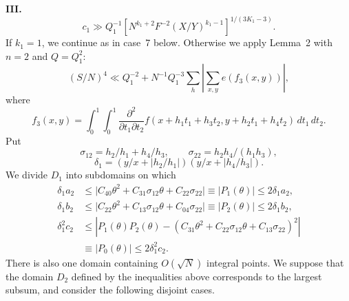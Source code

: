 \documentclass[10pt]{article}
\begin{document}
\medskip
\noindent\textbf{III.}
\[
  c_1\gg Q_1^{-1}
  \left[N^{k_1+2}F^{-2}(X/Y)^{k_1-1}\right]^{1/(3K_1-3)}.
\]
If $k_1=1$, we continue as in case~7 below. Otherwise we apply Lemma~2 with $n=2$ and $Q=Q_1^2$:
\[
  (S/N)^4\ll Q_1^{-2}
  +N^{-1}Q_1^{-3}\sum_h
   \left\lvert\sum_{x,y}e(f_3(x,y))\right\rvert,
\]
where
\[
  f_3(x,y)=\int_0^1\!\int_0^1
  \frac{\partial^2}{\partial t_1\partial t_2}
  f(x+h_1t_1+h_3t_2,y+h_2t_1+h_4t_2)\,dt_1\,dt_2.
\]
Put
\[
  \sigma_{12}=h_2/h_1+h_4/h_3,\qquad
  \sigma_{22}=h_2h_4/(h_1h_3),
\]
\[
  \delta_1=(y/x+\lvert h_2/h_1\rvert)
            (y/x+\lvert h_4/h_3\rvert).
\]
We divide $D_1$ into subdomains on which
\[
\begin{aligned}
\delta_1a_2&\leqslant
 \lvert C_{40}\theta^2+C_{31}\sigma_{12}\theta+C_{22}\sigma_{22}\rvert
 \equiv\lvert P_1(\theta)\rvert\leqslant2\delta_1a_2,\\
\delta_1b_2&\leqslant
 \lvert C_{22}\theta^2+C_{13}\sigma_{12}\theta+C_{04}\sigma_{22}\rvert
 \equiv\lvert P_2(\theta)\rvert\leqslant2\delta_1b_2,\\
\delta_1^2c_2&\leqslant
 \left\lvert P_1(\theta)P_2(\theta)
 -(C_{31}\theta^2+C_{22}\sigma_{12}\theta+C_{13}\sigma_{22})^2
 \right\rvert\\
&\equiv\lvert P_0(\theta)\rvert\leqslant2\delta_1^2c_2.
\end{aligned}
\]
There is also one domain containing $O(\sqrt N)$ integral points. We suppose that the domain $D_2$ defined by the inequalities above corresponds to the largest subsum, and consider the following disjoint cases.
\end{document}
